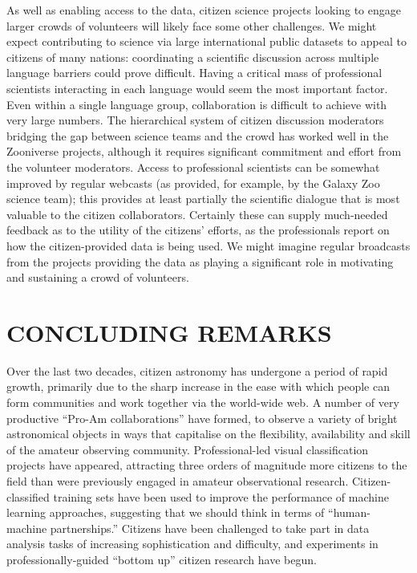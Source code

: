 \documentclass{ar2e}
\begin{document}
As well as enabling access to the data, citizen science projects looking to
engage larger crowds of volunteers will likely face some other  challenges. We
might expect contributing to science via large international public datasets to
appeal to citizens of many nations: coordinating a scientific discussion across
multiple language barriers could prove difficult. Having a critical mass of
professional scientists interacting in each language would seem the most
important factor. Even within a single language group, collaboration is
difficult to achieve with  very large numbers. The hierarchical system of
citizen discussion  moderators bridging the gap between science teams and the
crowd has worked well in the Zooniverse projects, although it requires
significant commitment and effort from the volunteer moderators. Access to
professional scientists can be somewhat improved by regular webcasts (as
provided, for example, by the Galaxy Zoo science team); this provides at least
partially the scientific dialogue that is most valuable to the citizen
collaborators. Certainly these can supply much-needed feedback as to the utility
of the citizens' efforts, as the professionals report on how the
citizen-provided data is being used. We might imagine regular broadcasts from
the projects providing the data as playing a significant role in motivating and
sustaining a crowd of volunteers.



\section{CONCLUDING REMARKS}
\label{sec:conclusions}

Over the last two decades, citizen astronomy has undergone a period of rapid
growth, primarily due to the sharp increase in the ease with which people can
form communities and work together via the world-wide web.   A number of very
productive ``Pro-Am collaborations'' have formed, to observe a variety of bright
astronomical objects in ways that capitalise on the flexibility, availability
and skill of the amateur observing community. Professional-led visual
classification projects have appeared, attracting three orders of magnitude more
citizens to the field than were previously engaged in amateur observational
research. Citizen-classified training sets have been used to improve the
performance of  machine learning approaches, suggesting that we should think in
terms of ``human-machine partnerships.'' Citizens have been challenged to take
part in data analysis tasks of increasing sophistication and difficulty, and
experiments in professionally-guided ``bottom up'' citizen research have begun.
\end{document}
